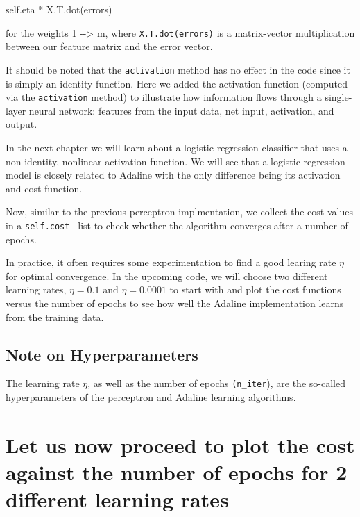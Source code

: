 \documentclass[11pt]{article}
\newenvironment{Shaded}{}{}
\newcommand{\NormalTok}[1]{{#1}}
\newcommand{\VariableTok}[1]{\textcolor[rgb]{0.10,0.09,0.49}{{#1}}}
\newcommand{\OperatorTok}[1]{\textcolor[rgb]{0.40,0.40,0.40}{{#1}}}
\begin{document}
\begin{Shaded}
\begin{Highlighting}[]
\VariableTok{self}\NormalTok{.eta }\OperatorTok{*}\NormalTok{ X.T.dot(errors)}
\end{Highlighting}
\end{Shaded}

for the weights 1 -\/-\textgreater{} m, where \texttt{X.T.dot(errors)}
is a matrix-vector multiplication between our feature matrix and the
error vector.

It should be noted that the \texttt{activation} method has no effect in
the code since it is simply an identity function. Here we added the
activation function (computed via the \texttt{activation} method) to
illustrate how information flows through a single-layer neural network:
features from the input data, net input, activation, and output.

In the next chapter we will learn about a logistic regression classifier
that uses a non-identity, nonlinear activation function. We will see
that a logistic regression model is closely related to Adaline with the
only difference being its activation and cost function.

Now, similar to the previous perceptron implmentation, we collect the
cost values in a \texttt{self.cost\_} list to check whether the
algorithm converges after a number of epochs.

In practice, it often requires some experimentation to find a good
learing rate \(\eta\) for optimal convergence. In the upcoming code, we
will choose two different learning rates, \(\eta = 0.1\) and
\(\eta = 0.0001\) to start with and plot the cost functions versus the
number of epochs to see how well the Adaline implementation learns from
the training data.

\subsection{Note on Hyperparameters}\label{note-on-hyperparameters}

The learning rate \(\eta\), as well as the number of epochs
\texttt{(n\_iter}), are the so-called hyperparameters of the perceptron
and Adaline learning algorithms.

    \section{Let us now proceed to plot the cost against the number of
epochs for 2 different learning
rates}\label{let-us-now-proceed-to-plot-the-cost-against-the-number-of-epochs-for-2-different-learning-rates}
\end{document}
